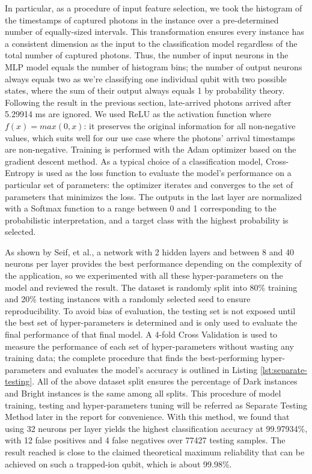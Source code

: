 \documentclass[letterpaper,twocolumn,10pt]{article}
\begin{document}
In particular, as a procedure of input feature selection, we took the histogram of the timestamps of captured photons in the instance over a pre-determined number of equally-sized intervals. This transformation ensures every instance has a consistent dimension as the input to the classification model regardless of the total number of captured photons. Thus, the number of input neurons in the MLP model equals the number of histogram bins; the number of output neurons always equals two as we're classifying one individual qubit with two possible states, where the sum of their output always equals 1 by probability theory. Following the result in the previous section, late-arrived photons arrived after 5.29914 ms are ignored. We used ReLU as the activation function where $f(x) = max(0, x)$: it preserves the original information for all non-negative values, which suits well for our use case where the photons' arrival timestamps are non-negative. Training is performed with the Adam optimizer based on the gradient descent method. As a typical choice of a classification model, Cross-Entropy is used as the loss function to evaluate the model's performance on a particular set of parameters: the optimizer iterates and converges to the set of parameters that minimizes the loss. The outputs in the last layer are normalized with a Softmax function to a range between 0 and 1 corresponding to the probabilistic interpretation, and a target class with the highest probability is selected.

As shown by Seif, et al., a network with 2 hidden layers and between 8 and 40 neurons per layer provides the best performance depending on the complexity of the application, so we experimented with all these hyper-parameters on the model and reviewed the result. The dataset is randomly split into 80\% training and 20\% testing instances with a randomly selected seed to ensure reproducibility. To avoid bias of evaluation, the testing set is not exposed until the best set of hyper-parameters is determined and is only used to evaluate the final performance of that final model. A 4-fold Cross Validation is used to measure the performance of each set of hyper-parameters without wasting any training data; the complete procedure that finds the best-performing hyper-parameters and evaluates the model's accuracy is outlined in Listing \ref{lst:separate-testing}. All of the above dataset split ensures the percentage of Dark instances and Bright instances is the same among all splits. This procedure of model training, testing and hyper-parameters tuning will be referred as Separate Testing Method later in the report for convenience. With this method, we found that using 32 neurons per layer yields the highest classification accuracy at 99.97934\%, with 12 false positives and 4 false negatives over 77427 testing samples. The result reached is close to the claimed theoretical maximum reliability that can be achieved on such a trapped-ion qubit, which is about 99.98\%.
\end{document}
